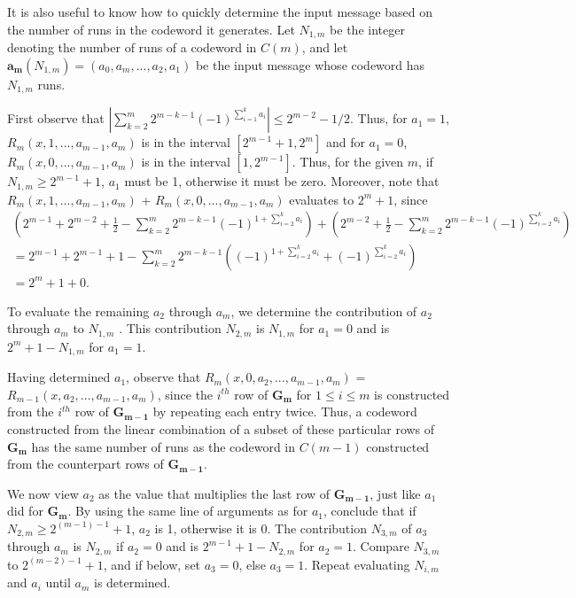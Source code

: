 {It is also useful to know how to quickly determine the input message
based on the number of runs in the codeword it generates. Let
$N_{1,m}$ be the integer denoting the number of runs of a codeword
in $C(m)$, and let $\mathbf{a_m}(N_{1,m})=(a_0,a_m,...,a_{2},a_1)$
be the input message whose codeword has $N_{1,m}$ runs.%

First observe that $|\sum_{k=2}^m
2^{m-k-1}(-1)^{\sum_{i=1}^ka_i}|\leq 2^{m-2}-1/2$. Thus, for
$a_1=1$, $R_m(x,1,...,a_{m-1},a_m)$ is in the interval $[2^{m-1}+1,
2^m]$ and for $a_1=0$, $R_m(x,0,...,a_{m-1},a_m)$ is in the interval
$[1,2^{m-1}]$. Thus, for the given $m$, if $N_{1,m} \geq 2^{m-1}+1$,
$a_1$ must be 1, otherwise it must be zero. Moreover, note that
$R_m(x,1,...,a_{m-1},a_m)$ + $R_m(x,0,...,a_{m-1},a_m)$ evaluates to
$2^m+1$, since
\begin{equation*}\begin{array}{lll}
\left(2^{m-1}+2^{m-2}+\frac{1}{2}-\sum_{k=2}^m2^{m-k-1}(-1)^{1+\sum_{i=2}^k
a_i}\right)+\left(2^{m-2}+\frac{1}{2}-\sum_{k=2}^m2^{m-k-1}(-1)^{\sum_{i=2}^k
a_i}\right)\\= 2^{m-1}+2^{m-1}+1-\sum_{k=2}^m2^{m-k-1}
\left((-1)^{1+\sum_{i=2}^k a_i}+ (-1)^{\sum_{i=2}^k a_i}\right)\\
=2^m+1+0.
\end{array}\end{equation*}

To evaluate the remaining $a_2$ through $a_m$, we determine the
contribution of $a_2$ through $a_m$ to $N_{1,m}$ . This contribution
$N_{2,m}$ is $N_{1,m}$ for $a_1=0$ and is $2^{m}+1-N_{1,m}$ for
$a_1=1$.

Having determined $a_1$, observe that $R_m(x,0,a_2,...,a_{m-1},a_m)$
= $R_{m-1}(x,a_2,...,a_{m-1},a_m)$, since the $i^{th}$ row of
$\mathbf{G_m}$ for $1 \leq i \leq m$ is constructed from the
$i^{th}$ row of $\mathbf{G_{m-1}}$ by repeating each entry twice.
Thus, a codeword constructed from the linear combination of a subset
of these particular rows of $\mathbf{G_m}$ has the same number of
runs as the codeword in $C(m-1)$ constructed from the counterpart
rows of $\mathbf{G_{m-1}}$.

We now view $a_2$ as the value that multiplies the last row of
$\mathbf{G_{m-1}}$, just like $a_1$ did for $\mathbf{G_{m}}$. By
using the same line of arguments as for $a_1$, conclude that if
$N_{2,m} \geq 2^{(m-1)-1}+1$, $a_2$ is 1, otherwise it is 0. The
contribution $N_{3,m}$ of $a_3$ through $a_m$ is $N_{2,m}$ if
$a_2=0$ and is $2^{m-1}+1-N_{2,m}$ for $a_2=1$. Compare $N_{3,m}$ to
$2^{(m-2)-1}+1$, and if below, set $a_3=0$, else $a_3=1$. Repeat
evaluating $N_{i,m}$ and $a_i$ until $a_m$ is determined.

}
